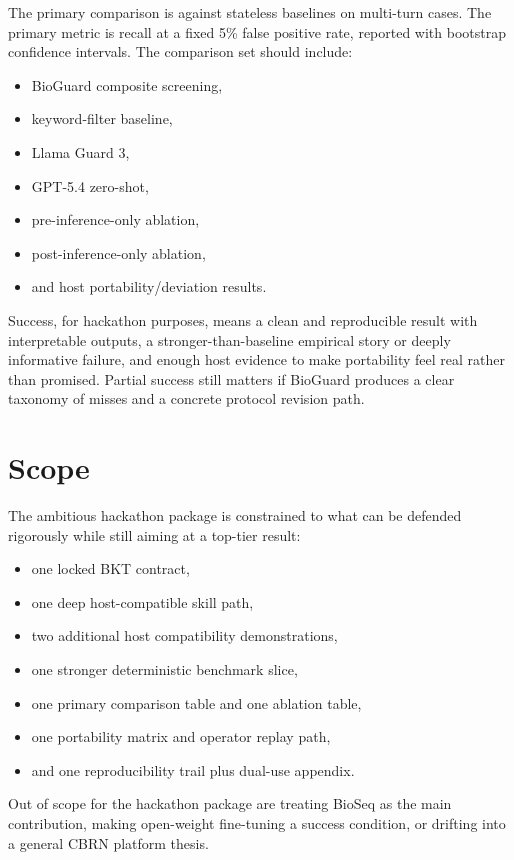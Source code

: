 \documentclass[10.5pt,a4paper]{article}
\begin{document}
The primary comparison is against stateless baselines on multi-turn cases. The primary metric is recall at a fixed 5\% false positive rate, reported with bootstrap confidence intervals. The comparison set should include:
\begin{itemize}[leftmargin=1.2em]
  \item BioGuard composite screening,
  \item keyword-filter baseline,
  \item Llama Guard 3,
  \item GPT-5.4 zero-shot,
  \item pre-inference-only ablation,
  \item post-inference-only ablation,
  \item and host portability/deviation results.
\end{itemize}

Success, for hackathon purposes, means a clean and reproducible result with interpretable outputs, a stronger-than-baseline empirical story or deeply informative failure, and enough host evidence to make portability feel real rather than promised. Partial success still matters if BioGuard produces a clear taxonomy of misses and a concrete protocol revision path.

\section*{Scope}

The ambitious hackathon package is constrained to what can be defended rigorously while still aiming at a top-tier result:
\begin{itemize}[leftmargin=1.2em]
  \item one locked BKT contract,
  \item one deep host-compatible skill path,
  \item two additional host compatibility demonstrations,
  \item one stronger deterministic benchmark slice,
  \item one primary comparison table and one ablation table,
  \item one portability matrix and operator replay path,
  \item and one reproducibility trail plus dual-use appendix.
\end{itemize}

Out of scope for the hackathon package are treating BioSeq as the main contribution, making open-weight fine-tuning a success condition, or drifting into a general CBRN platform thesis.
\end{document}
